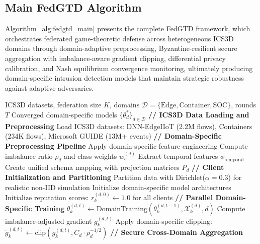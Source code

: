 \documentclass[12pt,a4paper]{article}
\theoremstyle{definition}
\newcommand{\D}{\mathcal{D}}
\begin{document}
\subsection{Main FedGTD Algorithm}

Algorithm~\ref{alg:fedgtd_main} presents the complete FedGTD framework, which orchestrates federated game-theoretic defense across heterogeneous ICS3D domains through domain-adaptive preprocessing, Byzantine-resilient secure aggregation with imbalance-aware gradient clipping, differential privacy calibration, and Nash equilibrium convergence monitoring, ultimately producing domain-specific intrusion detection models that maintain strategic robustness against adaptive adversaries.

\begin{algorithm}[!t]
\caption{FedGTD: Federated Game-Theoretic Defense for ICS3D}
\label{alg:fedgtd_main}
\begin{algorithmic}[1]
\Require ICS3D datasets, federation size $K$, domains $\mathcal{D} = \{\text{Edge}, \text{Container}, \text{SOC}\}$, rounds $T$
\Ensure Converged domain-specific models $\{\theta_d^*\}_{d \in \mathcal{D}}$
\State \textbf{// ICS3D Data Loading and Preprocessing}
\State Load ICS3D datasets: DNN-EdgeIIoT (2.2M flows), Containers (234K flows), Microsoft GUIDE (13M+ events)
\State \textbf{// Domain-Specific Preprocessing Pipeline}
    \State Apply domain-specific feature engineering
    \State Compute imbalance ratio $\rho_d$ and class weights $w_c^{(d)}$
    \State Extract temporal features $\phi_{\text{temporal}}$
    \State Create unified schema mapping with projection matrices $P_d$
\EndFor
\State \textbf{// Client Initialization and Partitioning}
\State Partition data with Dirichlet($\alpha=0.3$) for realistic non-IID simulation
\State Initialize domain-specific model architectures
\State Initialize reputation scores: $r_k^{(d,0)} \leftarrow 1.0$ for all clients
    \State \textbf{// Parallel Domain-Specific Training}
        \For{each client $k \in \D_d$}
            \State $\theta_k^{(d,t)} \leftarrow \text{DomainTraining}(\theta_k^{(d,t-1)}, \mathcal{X}_k^{(d)}, d)$ 
            \State Compute imbalance-adjusted gradient $g_k^{(d,t)}$
            \State Apply domain-specific clipping: $\tilde{g}_k^{(d,t)} \leftarrow \text{clip}(g_k^{(d,t)}, C_d \cdot \rho_d^{-1/2})$
        \EndFor
    \EndFor
    \State \textbf{// Secure Cross-Domain Aggregation}

\end{algorithmic}
\end{algorithm}
\end{document}
